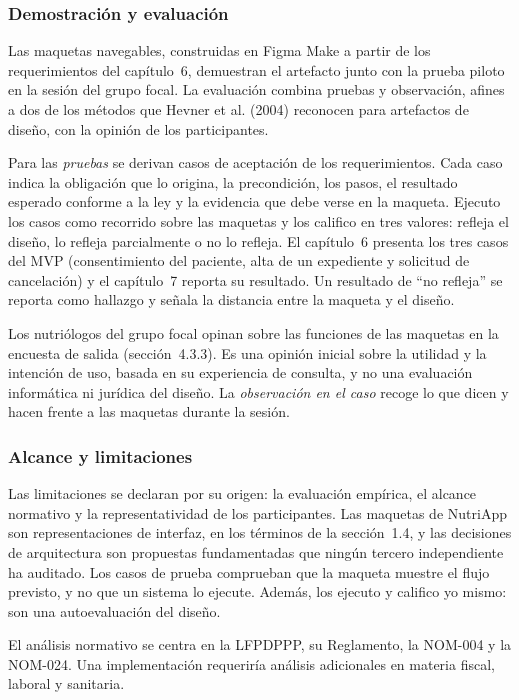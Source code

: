 \documentclass[12pt, a4paper]{article}
\begin{document}
\subsubsection{Demostración y evaluación}
 
Las maquetas navegables, construidas en Figma Make a partir de los
requerimientos del capítulo~6, demuestran el artefacto junto con la
prueba piloto en la sesión del grupo focal. La evaluación
combina pruebas y observación, afines a dos de los
métodos que Hevner et al. (2004) reconocen para artefactos de diseño, con la opinión de los participantes.
 
Para las \textit{pruebas} se derivan casos de aceptación de los
requerimientos. Cada caso indica la obligación que lo origina, la
precondición, los pasos, el resultado esperado conforme a la ley y la
evidencia que debe verse en la maqueta. Ejecuto los casos como
recorrido sobre las maquetas y los califico en tres valores: refleja
el diseño, lo refleja parcialmente o no lo refleja. El capítulo~6
presenta los tres casos del MVP (consentimiento del
paciente, alta de un expediente y solicitud de cancelación) y el
capítulo~7 reporta su resultado. Un resultado de ``no refleja'' se
reporta como hallazgo y señala la distancia entre la maqueta y el
diseño.
 
Los nutriólogos del grupo focal opinan sobre las funciones de las maquetas en
la encuesta de salida (sección~4.3.3). Es una opinión inicial sobre la utilidad y la intención de uso, basada en su experiencia de consulta, y no una evaluación informática ni jurídica del diseño. La
\textit{observación en el caso} recoge lo que dicen y hacen frente a
las maquetas durante la sesión.
 
\subsubsection{Alcance y limitaciones}
 
Las limitaciones se declaran por su origen: la evaluación empírica, el
alcance normativo y la representatividad de los participantes. Las
maquetas de NutriApp son representaciones de interfaz, en los términos
de la sección~1.4, y las decisiones de arquitectura son propuestas
fundamentadas que ningún tercero independiente ha auditado. Los casos de
prueba comprueban que la maqueta muestre el flujo previsto, y no que un
sistema lo ejecute. Además, los ejecuto y califico yo mismo: son
una autoevaluación del diseño.
 
El análisis normativo se centra en la LFPDPPP, su Reglamento, la
NOM-004 y la NOM-024. Una implementación requeriría análisis
adicionales en materia fiscal, laboral y sanitaria.
 
\end{document}
